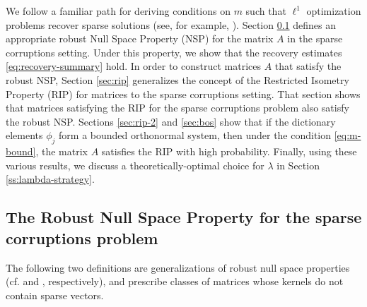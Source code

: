 \documentclass[10.5pt]{article}
\begin{document}
We follow a familiar path for deriving conditions on $m$ such that $\ell^1$ optimization problems recover sparse solutions (see, for example, \cite{FoucartRauhutCSbook}). Section \ref{sec:robust-nsp} defines an appropriate robust Null Space Property (NSP) for the matrix $A$ in the sparse corruptions setting. Under this property, we show that the recovery estimates \eqref{eq:recovery-summary} hold. In order to construct matrices $A$ that satisfy the robust NSP, Section \ref{sec:rip} generalizes the concept of the Restricted Isometry Property (RIP) for matrices to the sparse corruptions setting. That section shows that matrices satisfying the RIP for the sparse corruptions problem also satisfy the robust NSP.  Sections \ref{sec:rip-2} and \ref{sec:bos} show that if the dictionary elements $\phi_j$ form a bounded orthonormal system, then under the condition \eqref{eq:m-bound}, the matrix $A$ satisfies the RIP with high probability.  Finally, using these various results, we discuss a theoretically-optimal choice for $\lambda$ in Section \ref{ss:lambda-strategy}.

\subsection{The Robust Null Space Property for the sparse corruptions problem}\label{sec:robust-nsp}




The following two definitions are generalizations of robust null space properties (cf. \cite[Definition 4.17]{FoucartRauhutCSbook} and \cite[Definition 4.21]{FoucartRauhutCSbook}, respectively), and prescribe classes of matrices whose kernels do not contain sparse vectors.
\end{document}
